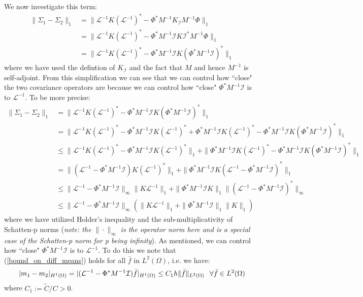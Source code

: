 \documentclass{article}
\theoremstyle{definition}
\theoremstyle{remark}
\begin{document}
We now investigate this term:
\begin{align*}
    \|\Sigma_{1}-\Sigma_2\|_{1}&=\|\mathcal{L}^{-1}K(\mathcal{L}^{-1})^{*}-\Phi^{*}M^{-1}K_{\mathcal{I}}M^{-1}\Phi\|_{1} \\
    &=\|\mathcal{L}^{-1}K(\mathcal{L}^{-1})^{*}-\Phi^{*}M^{-1}\mathcal{I}K\mathcal{I}^{*}M^{-1}\Phi\|_{1} \\
    &=\|\mathcal{L}^{-1}K(\mathcal{L}^{-1})^{*}-\Phi^{*}M^{-1}\mathcal{I}K(\Phi^{*}M^{-1}\mathcal{I})^{*}\|_{1}
\end{align*}
where we have used the defintion of $K_{\mathcal{I}}$ and the fact that $M$ and hence $M^{-1}$ is self-adjoint. From this simplification we can see that we can control how ``close" the two covariance operators are because we can control how ``close" $\Phi^{*}M^{-1}\mathcal{I}$ is to $\mathcal{L}^{-1}$. To be more precise:
\begin{align*}
    \|\Sigma_{1}-\Sigma_{2}\|_{1}&=\|\mathcal{L}^{-1}K(\mathcal{L}^{-1})^{*}-\Phi^{*}M^{-1}\mathcal{I}K(\Phi^{*}M^{-1}\mathcal{I})^{*}\|_{1} \\
    &=\|\mathcal{L}^{-1}K(\mathcal{L}^{-1})^{*}-\Phi^{*}M^{-1}\mathcal{I}K(\mathcal{L}^{-1})^{*}+\Phi^{*}M^{-1}\mathcal{I}K(\mathcal{L}^{-1})^{*}-\Phi^{*}M^{-1}\mathcal{I}K(\Phi^{*}M^{-1}\mathcal{I})^{*}\|_{1} \\
    &\leq\|\mathcal{L}^{-1}K(\mathcal{L}^{-1})^{*}-\Phi^{*}M^{-1}\mathcal{I}K(\mathcal{L}^{-1})^{*}\|_{1} + \|\Phi^{*}M^{-1}\mathcal{I}K(\mathcal{L}^{-1})^{*}-\Phi^{*}M^{-1}\mathcal{I}K(\Phi^{*}M^{-1}\mathcal{I})^{*}\|_{1} \\
    &= \|(\mathcal{L}^{-1}-\Phi^{*}M^{-1}\mathcal{I})K(\mathcal{L}^{-1})^{*}\|_{1} + \|\Phi^{*}M^{-1}\mathcal{I}K(\mathcal{L}^{-1}-\Phi^{*}M^{-1}\mathcal{I})^{*}\|_{1} \\
    &\leq\|\mathcal{L}^{-1}-\Phi^{*}M^{-1}\mathcal{I}\|_{\infty}\|K\mathcal{L}^{-1}\|_{1}+\|\Phi^{*}M^{-1}\mathcal{I}K\|_{1}\|(\mathcal{L}^{-1}-\Phi^{*}M^{-1}\mathcal{I})^{*}\|_{\infty} \\
    &\leq\|\mathcal{L}^{-1}-\Phi^{*}M^{-1}\mathcal{I}\|_{\infty}(\|K\mathcal{L}^{-1}\|_{1}+\|\Phi^{*}M^{-1}\mathcal{I}\|_{1}\|K\|_{1})
\end{align*}
where we have utilized Holder's inequality and the sub-multiplicativity of Schatten-p norms (\textit{note: the} $\|\cdot\|_{\infty}$ \textit{is the operator norm here and is a special case of the Schatten-p norm for p being infinity}). As mentioned, we can control how ``close" $\Phi^{*}M^{-1}\mathcal{I}$ is to $\mathcal{L}^{-1}$. To do this we note that (\ref{bound_on_diff_means}) holds for all $\bar{f}$ in $L^{2}(\Omega)$, i.e. we have:
\begin{equation*}
    |m_1-m_2|_{H^{1}(\Omega)}=|(\mathcal{L}^{-1}-\Phi^{*}M^{-1}\mathcal{I})\bar{f}|_{H^{1}(\Omega)}\leq C_{1}h\|\bar{f}\|_{L^2(\Omega)} \hspace{0.25cm} \forall\bar{f}\in L^{2}(\Omega)
\end{equation*}
where $C_1:=\tilde{C}/C>0$. \\
\end{document}
